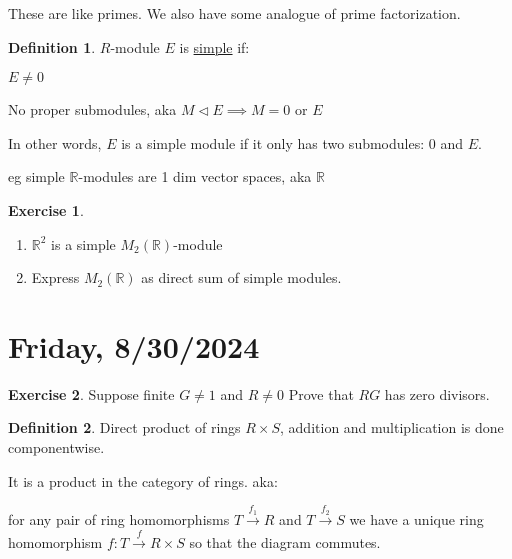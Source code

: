 \documentclass{article}
\theoremstyle{definition}
\newtheorem*{exercise}{Exercise}
\newtheorem*{definition}{Definition}
\begin{document}
These are like primes. We also have some analogue of prime factorization.

\begin{definition}
    \(R\)-module \(E\) is \underline{simple} if:

    \(E \neq 0\)

    No proper submodules, aka \(M \triangleleft E \implies M = 0\) or \(E\)

    In other words, \(E\) is a simple module if it only has two submodules: \(0\) and \(E\).

\end{definition}

eg simple \(\mathbb{R}\)-modules are 1 dim vector spaces, aka \(\mathbb{R}\) 

\begin{exercise}

    \begin{enumerate}[label=\alph*)]

        \item \(\mathbb{R}^2\) is a simple \(M_2(\mathbb{R})\)-module 

        \item Express \(M_2(\mathbb{R})\) as direct sum of simple modules. 
    \end{enumerate}

\end{exercise}

\section*{Friday, 8/30/2024}

\begin{exercise}

    Suppose finite \(G \neq 1\) and \(R \neq 0\) Prove that \(RG\) has zero divisors.

\end{exercise}

\begin{definition}
    Direct product of rings \(R \times S\), addition and multiplication is done componentwise.

    It is a product in the category of rings. aka:

    \begin{center}  
    \end{center}

    for any pair of ring homomorphisms \(T \overset{f_1}{\to} R\) and \(T \overset{f_2}{\to} S\) we have a unique ring homomorphism \(f: T \overset{f}{\to } R \times S\) so that the diagram commutes.

\end{definition}
\end{document}
